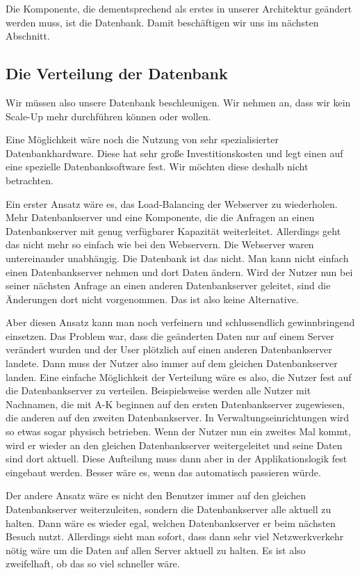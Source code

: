 \begin{itemize}
Die Komponente, die dementsprechend als erstes in unserer Architektur geändert werden muss, ist die Datenbank.
Damit beschäftigen wir uns im nächsten Abschnitt.

\subsection{Die Verteilung der Datenbank}
Wir müssen also unsere Datenbank beschleunigen. Wir nehmen an, dass wir kein Scale-Up mehr durchführen können oder
wollen.

Eine Möglichkeit wäre noch die Nutzung von sehr spezialisierter Datenbankhardware. Diese hat sehr große Investitionskosten
und legt einen auf eine spezielle Datenbanksoftware fest. Wir möchten diese deshalb nicht betrachten.

Ein erster Ansatz wäre es, das Load-Balancing der Webserver zu wiederholen. Mehr Datenbankserver und eine Komponente,
die die Anfragen an einen Datenbankserver mit genug verfügbarer Kapazität weiterleitet. Allerdings geht das
nicht mehr so einfach wie bei den Webservern. Die Webserver waren untereinander unabhängig. Die Datenbank ist
das nicht. Man kann nicht einfach einen Datenbankserver nehmen und dort Daten ändern. Wird der Nutzer nun
bei seiner nächsten Anfrage an einen anderen Datenbankserver geleitet, sind die Änderungen dort nicht vorgenommen.
Das ist also keine Alternative.

Aber diesen Ansatz kann man noch verfeinern und schlussendlich gewinnbringend einsetzen.  Das Problem war,
dass die geänderten Daten nur auf einem Server verändert wurden und der User plötzlich auf einen anderen
Datenbankserver landete. Dann muss der Nutzer also immer auf dem gleichen Datenbankserver landen.
Eine einfache Möglichkeit der Verteilung wäre es also, die Nutzer fest auf die Datenbankserver zu verteilen.
Beispielsweise werden alle Nutzer mit Nachnamen, die mit A-K beginnen auf den ersten Datenbankserver zugewiesen,
die anderen auf den zweiten Datenbankserver. In Verwaltungseinrichtungen wird so etwas sogar physisch betrieben.
Wenn der Nutzer nun ein zweites Mal kommt, wird er wieder an den gleichen Datenbankserver weitergeleitet und
seine Daten sind dort aktuell. Diese Aufteilung muss dann aber in der Applikationslogik fest eingebaut werden.
Besser wäre es, wenn das automatisch passieren würde.

Der andere Ansatz wäre es nicht den Benutzer immer auf den gleichen Datenbankserver weiterzuleiten, sondern
die Datenbankserver alle aktuell zu halten. Dann wäre es wieder egal, welchen Datenbankserver er beim nächsten
Besuch nutzt. Allerdings sieht man sofort, dass dann sehr viel Netzwerkverkehr nötig wäre um die Daten auf allen
Server aktuell zu halten. Es ist also zweifelhaft, ob das so viel schneller wäre.


\end{itemize}
